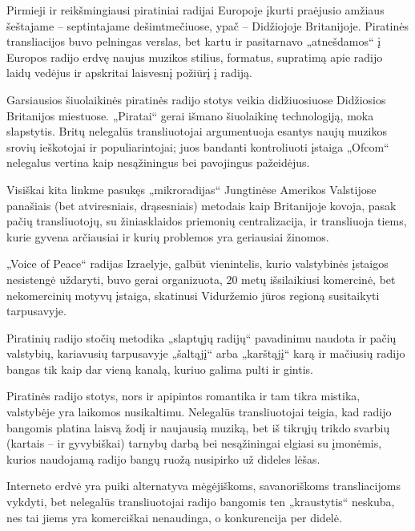 \documentclass[kursinis-darbas]{vukf}
\begin{document}
%
%

\vukfConclusion


Pirmieji ir reikšmingiausi piratiniai radijai Europoje įkurti praėjusio amžiaus šeštajame – septintajame dešimtmečiuose, ypač – Didžiojoje Britanijoje. Piratinės transliacijos buvo pelningas verslas, bet kartu ir pasitarnavo „atnešdamos“ į Europos radijo erdvę naujus muzikos stilius, formatus, supratimą apie radijo laidų vedėjus ir apskritai laisvesnį požiūrį į radiją.

Garsiausios šiuolaikinės piratinės radijo stotys veikia didžiuosiuose Didžiosios Britanijos miestuose. „Piratai“ gerai išmano šiuolaikinę technologiją, moka slapstytis. Britų nelegalūs transliuotojai argumentuoja esantys naujų muzikos srovių ieškotojai ir populiarintojai; juos bandanti kontroliuoti įstaiga „Ofcom“ nelegalus vertina kaip nesąžiningus bei pavojingus pažeidėjus.

Visiškai kita linkme pasukęs „mikroradijas“ Jungtinėse Amerikos Valstijose panašiais (bet atviresniais, drąsesniais) metodais kaip Britanijoje kovoja, pasak pačių transliuotojų, su žiniasklaidos priemonių centralizacija, ir transliuoja tiems, kurie gyvena arčiausiai ir kurių problemos yra geriausiai žinomos.

„Voice of Peace“ radijas Izraelyje, galbūt vienintelis, kurio valstybinės įstaigos nesistengė uždaryti, buvo gerai organizuota, 20 metų išsilaikiusi komercinė, bet nekomercinių motyvų įstaiga, skatinusi Viduržemio jūros regioną susitaikyti tarpusavyje.

Piratinių radijo stočių metodika „slaptųjų radijų“ pavadinimu naudota ir pačių valstybių, kariavusių tarpusavyje „šaltąjį“ arba „karštąjį“ karą ir mačiusių radijo bangas tik kaip dar vieną kanalą, kuriuo galima pulti ir gintis.

Piratinės radijo stotys, nors ir apipintos romantika ir tam tikra mistika, valstybėje yra laikomos nusikaltimu. Nelegalūs transliuotojai teigia, kad radijo bangomis platina laisvą žodį ir naujausią muziką, bet iš tikrųjų trikdo svarbių (kartais – ir gyvybiškai) tarnybų darbą bei nesąžiningai elgiasi su įmonėmis, kurios naudojamą radijo bangų ruožą nusipirko už dideles lėšas.

Interneto erdvė yra puiki alternatyva mėgėjiškoms, savanoriškoms transliacijoms vykdyti, bet nelegalūs transliuotojai radijo bangomis ten „kraustytis“ neskuba, nes tai jiems yra komerciškai nenaudinga, o konkurencija per didelė.


%
%


\end{document}
